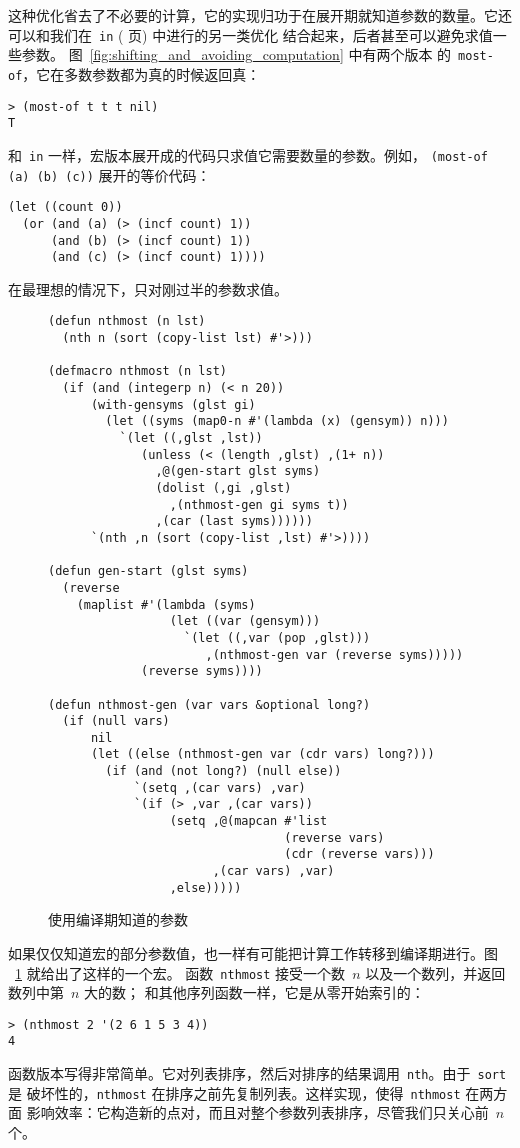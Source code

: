 这种优化省去了不必要的计算，它的实现归功于在展开期就知道参数的数量。它还可以和我们在~\verb|in|
(\pageref{fig:macros_for_conditional_evaluation} 页) 中进行的另一类优化
结合起来，后者甚至可以避免求值一些参数。
图~\ref{fig:shifting_and_avoiding_computation} 中有两个版本
的~\verb|most-of|，它在多数参数都为真的时候返回真：
\begin{lstlisting}
> (most-of t t t nil)
T
\end{lstlisting}
和~\verb|in| 一样，宏版本展开成的代码只求值它需要数量的参数。例如，
\verb|(most-of (a) (b) (c))| 展开的等价代码：
\begin{lstlisting}
(let ((count 0))
  (or (and (a) (> (incf count) 1))
      (and (b) (> (incf count) 1))
      (and (c) (> (incf count) 1))))
\end{lstlisting}
在最理想的情况下，只对刚过半的参数求值。

\begin{figure}
\begin{lstlisting}
(defun nthmost (n lst)
  (nth n (sort (copy-list lst) #'>)))

(defmacro nthmost (n lst)
  (if (and (integerp n) (< n 20))
      (with-gensyms (glst gi)
        (let ((syms (map0-n #'(lambda (x) (gensym)) n)))
          `(let ((,glst ,lst))
             (unless (< (length ,glst) ,(1+ n))
               ,@(gen-start glst syms)
               (dolist (,gi ,glst)
                 ,(nthmost-gen gi syms t))
               ,(car (last syms))))))
      `(nth ,n (sort (copy-list ,lst) #'>))))

(defun gen-start (glst syms)
  (reverse
    (maplist #'(lambda (syms)
                 (let ((var (gensym)))
                   `(let ((,var (pop ,glst)))
                      ,(nthmost-gen var (reverse syms)))))
             (reverse syms))))

(defun nthmost-gen (var vars &optional long?)
  (if (null vars)
      nil
      (let ((else (nthmost-gen var (cdr vars) long?)))
        (if (and (not long?) (null else))
            `(setq ,(car vars) ,var)
            `(if (> ,var ,(car vars))
                 (setq ,@(mapcan #'list
                                 (reverse vars)
                                 (cdr (reverse vars)))
                       ,(car vars) ,var)
                 ,else)))))
\end{lstlisting}
  \caption{使用编译期知道的参数}
  \label{fig:use_of_arguments_known_at_compile-time}
\end{figure}

如果仅仅知道宏的部分参数值，也一样有可能把计算工作转移到编译期进行。图
~\ref{fig:use_of_arguments_known_at_compile-time} 就给出了这样的一个宏。
函数~\verb|nthmost| 接受一个数~$n$ 以及一个数列，并返回数列中第~$n$ 大的数；
和其他序列函数一样，它是从零开始索引的：
\begin{lstlisting}
> (nthmost 2 '(2 6 1 5 3 4))
4
\end{lstlisting}
函数版本写得非常简单。它对列表排序，然后对排序的结果调用~\verb|nth|。由于~\verb|sort| 是
破坏性的，\verb|nthmost| 在排序之前先复制列表。这样实现，使得~\verb|nthmost| 在两方面
影响效率：它构造新的点对，而且对整个参数列表排序，尽管我们只关心前~$n$ 个。

